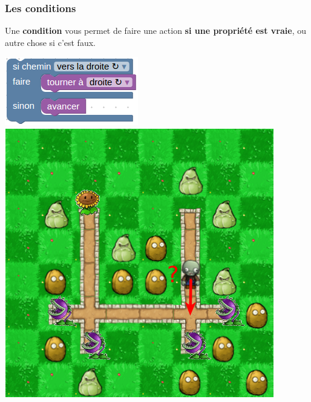 \documentclass{beamer}
\begin{document}
\begin{frame}
	\frametitle{Les conditions}

	Une \textbf{condition} vous permet de faire une action \textbf{si une propriété est vraie},
	ou autre chose si c'est faux.

	\includegraphics[width=0.45\linewidth]{blocks_ifElse.png}
	\includegraphics[width=0.45\linewidth]{vizualization_ifElse.png}

\end{frame}
\end{document}
